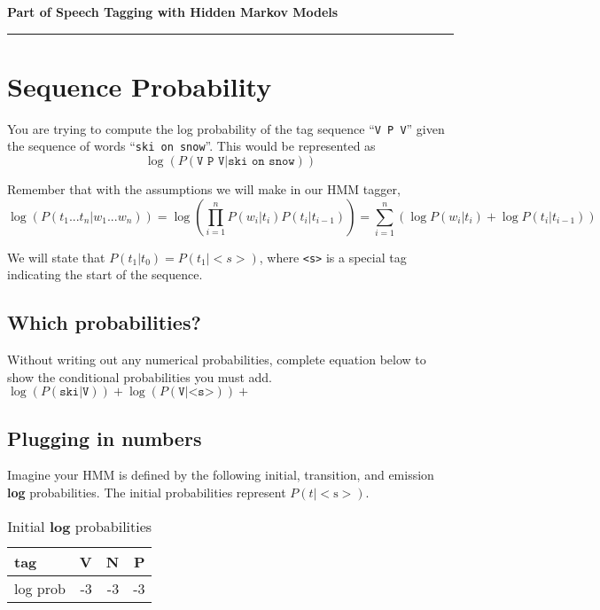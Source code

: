 \documentclass{article}
\newcommand{\worksheetname}{Part of Speech Tagging with Hidden Markov Models}
\begin{document}
{\Large\textbf{\worksheetname}}\\\rule{\linewidth}{0.5mm}

\section{Sequence Probability} You are trying to compute the log probability of the tag sequence ``\texttt{V P V}'' given the sequence of words ``\texttt{ski on snow}''. This would be represented as $$\log(P(\texttt{V P V}|\texttt{ski on snow}))$$

Remember that with the assumptions we will make in our HMM tagger,
\begin{equation*}
\log{(P(t_1...t_n|w_1...w_n))}=\log{ \left( \prod_{i=1}^{n} P(w_i|t_i)P(t_i|t_{i-1})\right)} = \sum_{i=1}^{n} \left( \log{P(w_i|t_i)} + \log{P(t_i|t_{i-1})} \right) 
\end{equation*}

We will state that $P(t_1|t_{0}) = P(t_1|<s>)$, where \texttt{<s>} is a special tag indicating the start of the sequence.

\subsection{Which probabilities?}
Without writing out any numerical probabilities, complete equation below to show the conditional probabilities you must add.\\

\noindent $\log{(P(\texttt{ski}|\texttt{V}))} + \log{(P(\texttt{V}|\texttt{<s>}))} +$

\vspace{1in}
\subsection{Plugging in numbers}

Imagine your HMM is defined by the following initial, transition, and emission \textbf{log} probabilities. The initial probabilities represent $P(t|<\text{s}>)$.

\begin{table}[H]
\centering
\begin{tabular}{l|rrr}
tag & V & N & P \\ \hline
log prob & -3 & -3 & -3
\end{tabular}
\caption{Initial \textbf{log} probabilities}
\end{table}
\end{document}
